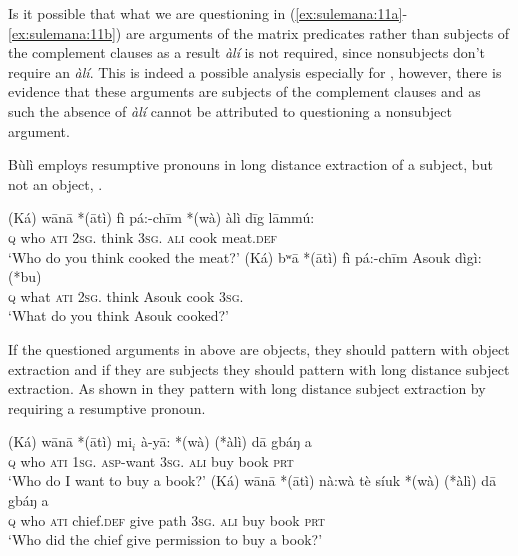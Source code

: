 \documentclass[output=paper,colorlinks,citecolor=brown]{langscibook}
\begin{document}
Is it possible that what we are questioning in (\ref{ex:sulemana:11a}-\ref{ex:sulemana:11b}) are arguments of the matrix predicates rather than subjects of the complement clauses as a result {\it{àlí}} is not required, since nonsubjects don't require an {\it{àlí}}. This is indeed a possible analysis especially for , however, there is evidence that these arguments are subjects of the complement clauses and as such the absence of {\it{àlí}} cannot be attributed to questioning a nonsubject argument. 

Bùlì employs resumptive pronouns in long distance extraction of a subject,  but not an object, .  

\ea%
    \label{ex:sulemana:12}
    \ea%
    \label{ex:sulemana:12a}
    \gll    (Ká) wānā *(ātì) fì pá:-chīm *(wà) àlì dīg lāmmú: \\
            \textsc{q} who \textsc{ati}   \textsc{2sg}.  think   \textsc{3sg}.  \textsc{ali} cook  meat.\textsc{def}\\
    \glt    `Who do you think cooked the meat?'
    \ex%
    \label{ex:sulemana:12b}
    \gll    (Ká) bʷā *(ātì) fì pá:-chīm Asouk dìgì: (*bu)  \\
            \textsc{q} what \textsc{ati}  \textsc{2sg}. think Asouk  cook   \textsc{3sg}. \\
    \glt    `What do you think Asouk cooked?'
    \z
\z

If the questioned arguments in  above are objects, they should pattern with object extraction and if they are subjects they should pattern with long distance subject extraction. As shown in  they pattern with long distance subject extraction by requiring a resumptive pronoun. 

\ea%
    \label{ex:sulemana:13}
    \ea%
    \label{ex:sulemana:13a}
    \gll    (Ká) wānā *(ātì) mi$_i$ à-yā: *(wà)  (*àlì) dā gbáŋ a \\
            \textsc{q} who \textsc{ati}   \textsc{1sg}. \textsc{asp}-want \textsc{3sg}.   \textsc{ali}  buy book \textsc{prt} \\
    \glt    `Who do I want  to buy a book?'
    \ex%
    \label{ex:sulemana:13b}
    \gll    (Ká) wānā *(ātì) nà:wà tè síuk  *(wà) (*àlì) dā gbáŋ a \\
            \textsc{q} who \textsc{ati}  chief.\textsc{def} give path  \textsc{3sg}.  \textsc{ali} buy book \textsc{prt}\\
    \glt    `Who did the chief give permission to buy a book?'
    \z
\z
\end{document}
